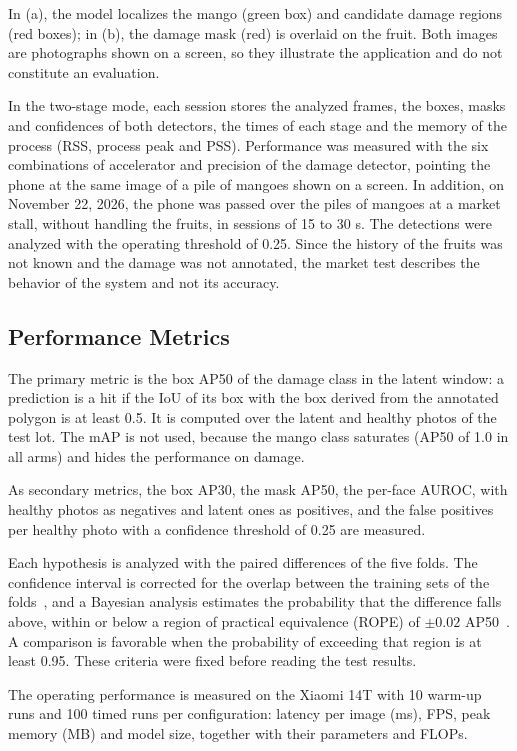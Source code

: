 \documentclass[journal]{IEEEtran}
\begin{document}
In (a), the model localizes the mango (green box) and candidate damage regions (red boxes); in (b), the damage mask (red) is overlaid on the fruit. Both images are photographs shown on a screen, so they illustrate the application and do not constitute an evaluation.

In the two-stage mode, each session stores the analyzed frames, the boxes, masks and confidences of both detectors, the times of each stage and the memory of the process (RSS, process peak and PSS). Performance was measured with the six combinations of accelerator and precision of the damage detector, pointing the phone at the same image of a pile of mangoes shown on a screen. In addition, on November 22, 2026, the phone was passed over the piles of mangoes at a market stall, without handling the fruits, in sessions of 15 to 30 s. The detections were analyzed with the operating threshold of 0.25. Since the history of the fruits was not known and the damage was not annotated, the market test describes the behavior of the system and not its accuracy.

\subsection{Performance Metrics}\label{sec:metrics}
The primary metric is the box AP50 of the damage class in the latent window: a prediction is a hit if the IoU of its box with the box derived from the annotated polygon is at least 0.5. It is computed over the latent and healthy photos of the test lot. The mAP is not used, because the mango class saturates (AP50 of 1.0 in all arms) and hides the performance on damage.

As secondary metrics, the box AP30, the mask AP50, the per-face AUROC, with healthy photos as negatives and latent ones as positives, and the false positives per healthy photo with a confidence threshold of 0.25 are measured.

Each hypothesis is analyzed with the paired differences of the five folds. The confidence interval is corrected for the overlap between the training sets of the folds~\cite{nadeau2003}, and a Bayesian analysis estimates the probability that the difference falls above, within or below a region of practical equivalence (ROPE) of $\pm 0.02$ AP50~\cite{benavoli2017}. A comparison is favorable when the probability of exceeding that region is at least 0.95. These criteria were fixed before reading the test results.

The operating performance is measured on the Xiaomi 14T with 10 warm-up runs and 100 timed runs per configuration: latency per image (ms), FPS, peak memory (MB) and model size, together with their parameters and FLOPs.
\end{document}
